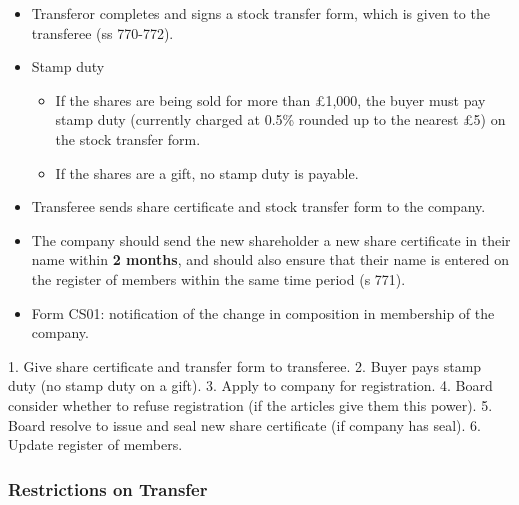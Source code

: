 \documentclass[
]{article}
\newenvironment{Shaded}{}{}
\newcommand{\NormalTok}[1]{#1}
\providecommand{\tightlist}{%
  \setlength{\itemsep}{0pt}\setlength{\parskip}{0pt}}
\begin{document}
\begin{itemize}
\tightlist
\item
  Transferor completes and signs a stock transfer form, which is given
  to the transferee (ss 770-772).
\item
  Stamp duty

  \begin{itemize}
  \tightlist
  \item
    If the shares are being sold for more than £1,000, the buyer must
    pay stamp duty (currently charged at 0.5\% rounded up to the nearest
    £5) on the stock transfer form.
  \item
    If the shares are a gift, no stamp duty is payable.
  \end{itemize}
\item
  Transferee sends share certificate and stock transfer form to the
  company.
\item
  The company should send the new shareholder a new share certificate in
  their name within \textbf{2 months}, and should also ensure that their
  name is entered on the register of members within the same time period
  (s 771).
\item
  Form CS01: notification of the change in composition in membership of
  the company.
\end{itemize}

\begin{Shaded}
\begin{Highlighting}[]
\NormalTok{1. Give share certificate and transfer form to transferee.}
\NormalTok{2. Buyer pays stamp duty (no stamp duty on a gift).}
\NormalTok{3. Apply to company for registration.}
\NormalTok{4. Board consider whether to refuse registration (if the articles give them this power).}
\NormalTok{5. Board resolve to issue and seal new share certificate (if company has seal).}
\NormalTok{6. Update register of members.}
\end{Highlighting}
\end{Shaded}

\hypertarget{restrictions-on-transfer}{%
\subsubsection{Restrictions on
Transfer}\label{restrictions-on-transfer}}
\end{document}
